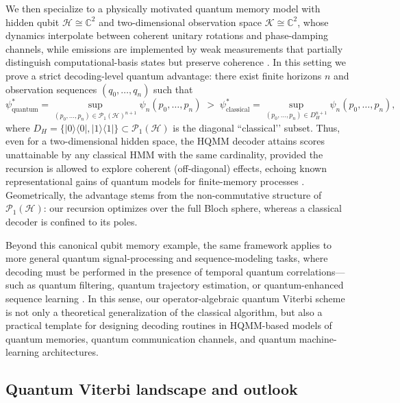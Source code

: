\documentclass[12pt, reco]{article}
\begin{document}
We then specialize to a physically motivated quantum memory model with hidden qubit \(\mathcal{H}\cong\mathbb{C}^2\) and two-dimensional observation space \(\mathcal{K}\cong\mathbb{C}^2\), whose dynamics interpolate between coherent unitary rotations and phase-damping channels, while emissions are implemented by weak measurements that partially distinguish computational-basis states but preserve coherence \cite{FR15,D18}. In this setting we prove a strict decoding-level quantum advantage: there exist finite horizons \(n\) and observation sequences \((q_0,\dots,q_n)\) such that
\[
\psi_{\mathrm{quantum}}^*
=
\sup_{(p_0,\dots,p_n)\in\mathcal{P}_1(\mathcal{H})^{n+1}} \psi_n(p_0,\dots,p_n)
\;>\;
\psi_{\mathrm{classical}}^*
=
\sup_{(p_0,\dots,p_n)\in D_H^{n+1}} \psi_n(p_0,\dots,p_n),
\]
where \(D_H=\{|0\rangle\langle0|,|1\rangle\langle1|\}\subset\mathcal{P}_1(\mathcal{H})\) is the diagonal “classical’’ subset. Thus, even for a two-dimensional hidden space, the HQMM decoder attains scores unattainable by any classical HMM with the same cardinality, provided the recursion is allowed to explore coherent (off-diagonal) effects, echoing known representational gains of quantum models for finite-memory processes \cite{Monras11,FLW24,Sou25}. Geometrically, the advantage stems from the non-commutative structure of \(\mathcal{P}_1(\mathcal{H})\): our recursion optimizes over the full Bloch sphere, whereas a classical decoder is confined to its poles.

Beyond this canonical qubit memory example, the same framework applies to more general quantum signal-processing and sequence-modeling tasks, where decoding must be performed in the presence of temporal quantum correlations—such as quantum filtering, quantum trajectory estimation, or quantum-enhanced sequence learning \cite{ticozzi2008,HY2018,SSP15,J22}. In this sense, our operator-algebraic quantum Viterbi scheme is not only a theoretical generalization of the classical algorithm, but also a practical template for designing decoding routines in HQMM-based models of quantum memories, quantum communication channels, and quantum machine-learning architectures.

\subsection{Quantum Viterbi landscape and outlook}
\end{document}
